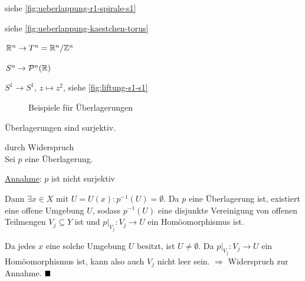 \begin{beispiel}
    \begin{bspenum}
        \item siehe \cref{fig:ueberlappung-r1-spirale-s1}
        \item siehe \cref{fig:ueberlappung-kaestchen-torus}
        \item $\mathbb{R}^n \rightarrow T^n = \mathbb{R}^n / \mathbb{Z}^n$
        \item $S^n \rightarrow \mathcal{P}^n(\mathbb{R})$
        \item $S^1 \rightarrow S^1$, $z \mapsto z^2$, siehe \cref{fig:liftung-s1-s1}
    \end{bspenum}

    \begin{figure}[ht]
        \centering
        \label{fig:ueberlagerungen}
        \caption{Beispiele für Überlagerungen}
    \end{figure}
\end{beispiel}

\begin{bemerkung}
    Überlagerungen sind surjektiv.
\end{bemerkung}

\begin{beweis}durch Widerspruch\\
    Sei $p$ eine Überlagerung.

    \underline{Annahme}: $p$ ist nicht surjektiv

    Dann $\exists x \in X$ mit $U=U(x): p^{-1}(U) = \emptyset$.
    Da $p$ eine Überlagerung ist, existiert eine offene Umgebung $U$,
    sodass $p^{-1}(U)$ eine disjunkte Vereinigung von offenen Teilmengen
    $V_j \subseteq Y$ ist und $p|_{V_j}: V_j \rightarrow U$ ein
    Homöomorphismus ist.

    Da jedes $x$ eine solche Umgebung $U$ besitzt, ist $U \neq \emptyset$.
    Da $p|_{V_j}: V_j \rightarrow U$ ein Homöomorphismus ist, kann also
    auch $V_j$ nicht leer sein. $\Rightarrow$ Widerspruch zur Annahme.
    $\qed$
\end{beweis}

